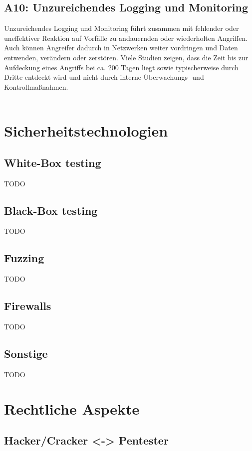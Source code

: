 \documentclass[12pt,oneside,a4paper,parskip]{scrbook}
\begin{document}
\subsection{A10: Unzureichendes Logging und Monitoring}
Unzureichendes Logging und Monitoring führt zusammen mit fehlender oder uneffektiver
Reaktion auf Vorfälle zu andauernden oder wiederholten Angriffen. Auch können Angreifer
dadurch in Netzwerken weiter vordringen und Daten entwenden, verändern oder zerstören.
Viele Studien zeigen, dass die Zeit bis zur Aufdeckung eines Angriffs bei ca. 200 Tagen
liegt sowie typischerweise durch Dritte entdeckt wird und nicht durch interne
Überwachungs- und Kontrollmaßnahmen.\\
\\
\cite{OWASPtop10}

\section{Sicherheitstechnologien}
\subsection{White-Box testing}
TODO

\subsection{Black-Box testing}
TODO

\subsection{Fuzzing}
TODO

\subsection{Firewalls}
TODO

\subsection{Sonstige}
TODO

\section{Rechtliche Aspekte}
\subsection{Hacker/Cracker <-> Pentester}
\end{document}
